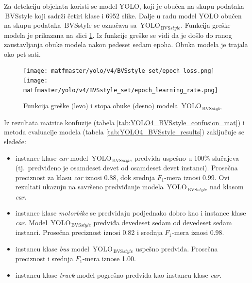 \documentclass[12pt,oneside]{memoir}
\newcommand{\yolo}{\ensuremath{\,\textrm{YOLO}}}
\newcommand{\bvs}{\ensuremath{\,\textrm{BVS}}}
\begin{document}
Za detekciju objekata koristi se model YOLO, koji je obučen na skupu podataka \bvs{style} koji sadrži četiri klase i 6952 slike. Dalje u radu model YOLO obučen na skupu podataka \bvs{style} se označava sa $\yolo_{\bvs{style}}$. Funkcija greške modela je prikazana na slici \ref{fig:YOLO4_BVSstyle_loss}. Iz funkcije greške se vidi da je došlo do ranog zaustavljanja obuke modela nakon pedeset sedam epoha. Obuka modela je trajala oko pet sati.


\begin{figure}[!ht]
\centering
    \texttt{[image: matfmaster/yolo/v4/BVSstyle\_set/epoch\_loss.png]}
    \texttt{[image: matfmaster/yolo/v4/BVSstyle\_set/epoch\_learning\_rate.png]}
\caption{Funkcija greške (levo) i stopa obuke (desno) modela $\yolo_{\bvs{style}}$ }
\label{fig:YOLO4_BVSstyle_loss}
\end{figure}

Iz rezultata matrice konfuzije (tabela \ref{tab:YOLO4_BVSstyle_confusion_mat}) i metoda evaluacije modela (tabela \ref{tab:YOLO4_BVSstyle_results}) zaključuje se sledeće:
\begin{itemize}
    \item instance klase \textit{car} model $\yolo_{\bvs{style}}$ predviđa uspešno u 100\% slučajeva (tj.~predviđeno je osamdeset devet od osamdeset devet instanci). Prosečna preciznost za klasu \textit{car} iznosi 0.88, dok srednja $F_1$-mera iznosi 0.99. Ovi rezultati ukazuju na savršeno predviđanje modela $\yolo_{\bvs{style}}$ nad klasom \textit{car}.
    \item instance klase \textit{motorbike} se predviđaju podjednako dobro kao i instance klase \textit{car}. Model $\yolo_{\bvs{style}}$ predviđa devedeset sedam od devedeset sedam instanci. Prosečna preciznost iznosi 0.82 i srednja $F_1$-mera iznosi 0.98.
    \item instancu klase \textit{bus} model $\yolo_{\bvs{style}}$ uspešno predviđa. Prosečna preciznost i srednja $F_1$-mera iznose 1.00.
    \item instancu klase \textit{truck} model pogrešno predviđa kao instancu klase \textit{car}. 
\end{itemize}
\end{document}
